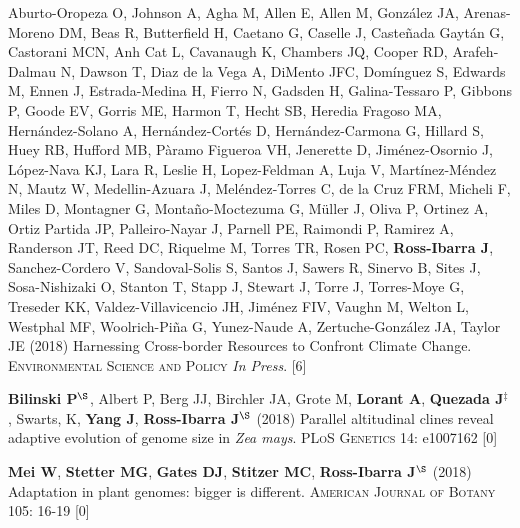 \documentclass[letterpaper,10pt]{article}
\begin{document}
\begin{etaremune}
\item  Aburto-Oropeza O, Johnson A, Agha M, Allen E,  Allen M,  Gonz\'{a}lez JA, Arenas-Moreno DM, Beas R, Butterfield H, Caetano G, Caselle J, Caste\~{n}ada Gayt\'{a}n G, Castorani MCN, Anh Cat L, Cavanaugh K, Chambers JQ, Cooper RD, Arafeh-Dalmau N, Dawson T, Diaz de la Vega A, DiMento JFC, Dom\'{i}nguez S, Edwards M, Ennen J, Estrada-Medina H, Fierro N, Gadsden H, Galina-Tessaro P, Gibbons P, Goode EV, Gorris ME, Harmon T, Hecht SB, Heredia Fragoso MA, Hern\'{a}ndez-Solano A, Hern\'{a}ndez-Cort\'{e}s D, Hern\'{a}ndez-Carmona G, Hillard S, Huey RB, Hufford MB, P\`{a}ramo Figueroa VH, Jenerette D, Jim\'{e}nez-Osornio J, L\'{o}pez-Nava KJ, Lara R, Leslie H, Lopez-Feldman A, Luja V, Mart\'{i}nez-M\'{e}ndez N, Mautz W, Medellin-Azuara J, Mel\'{e}ndez-Torres C, de la Cruz FRM,  Micheli F, Miles D, Montagner G, Monta\~{n}o-Moctezuma G, M\"{u}ller J, Oliva P, Ortinez A, Ortiz Partida JP, Palleiro-Nayar J, Parnell PE, Raimondi P, Ramirez A, Randerson JT, Reed DC, Riquelme M, Torres TR, Rosen PC, {\bf Ross-Ibarra J}, Sanchez-Cordero V, Sandoval-Solis S, Santos J, Sawers R, Sinervo B, Sites J,  Sosa-Nishizaki O, Stanton T, Stapp J, Stewart J, Torre J,  Torres-Moye G, Treseder KK, Valdez-Villavicencio JH, Jim\'{e}nez FIV, Vaughn M, Welton L, Westphal MF, Woolrich-Pi\~{n}a G,  Yunez-Naude A, Zertuche-Gonz\'{a}lez JA, Taylor JE (2018)
Harnessing Cross-border Resources to Confront Climate Change.  \textsc{Environmental Science and Policy} \textit{In Press}.
 [6]\\

\item \textbf{Bilinski P}$^\S$, Albert P, Berg JJ, Birchler JA, Grote M, \textbf{Lorant A}, \textbf{Quezada J}$^\ddagger$, Swarts, K, \textbf{Yang J}, \textbf{Ross-Ibarra J}$^\S$ (2018) Parallel altitudinal clines reveal adaptive evolution of genome size in \textit{Zea mays}. \textsc{PLoS Genetics} 14: e1007162
 [0]\\

\item {\bf Mei W}, {\bf Stetter MG}, {\bf Gates DJ}, {\bf Stitzer MC}, {\bf Ross-Ibarra J}$^\S$ (2018) Adaptation in plant genomes: bigger is different.  \textsc{American Journal of Botany} 105: 16-19
 [0]\\


\end{etaremune}
\end{document}
